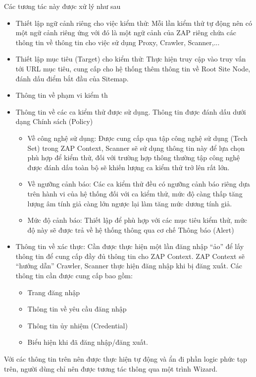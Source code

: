 \documentclass[./../main.tex]{subfiles}
\begin{document}
Các tương tác này được xử lý như sau
\begin{itemize}
	\item Thiết lập ngữ cảnh riêng cho việc kiểm thử: Mỗi lần kiểm thử tự động nên có một ngữ cảnh riêng ứng với đó là một ngữ cảnh của ZAP riêng chứa các thông tin về thông tin cho việc sử dụng Proxy, Crawler, Scanner,...
	\item Thiết lập mục tiêu (Target) cho kiểm thử: Thực hiện truy cập vào truy vấn tới URL mục tiêu, cung cấp cho hệ thống thêm thông tin về Root Site Node, đánh dấu điểm bắt đầu của Sitemap.
	\item Thông tin về phạm vi kiểm th
	\item Thông tin về các ca kiểm thử được sử dụng. Thông tin được đánh dấu dưới dạng Chính sách (Policy)
	      \begin{itemize}
		      \item Về công nghệ sử dụng: Được cung cấp qua tập công nghệ sử dụng (Tech Set) trong ZAP Context, Scanner sẽ sử dụng thông tin này để lựa chọn phù hợp để kiểm thử, đối với trường hợp thông thường tập công nghệ được đánh dấu toàn bộ sẽ khiến lượng ca kiểm thử trở lên rất lớn.
		      \item Về ngưỡng cảnh báo: Các ca kiểm thử đều có ngưỡng cảnh báo riêng dựa trên hành vi của hệ thống đối với ca kiểm thử, mức độ càng thấp tăng lượng âm tính giả càng lớn ngược lại làm tăng mức dương tính giả.
		      \item Mức độ cảnh báo: Thiết lập để phù hợp với các mục tiêu kiểm thử, mức độ này sẽ được trả về hệ thống thông qua cơ chế Thông báo (Alert)
	      \end{itemize}
	\item Thông tin về xác thực: Cần được thực hiện một lần đăng nhập “ảo” để lấy thông tin để cung cấp đầy đủ thông tin cho ZAP Context. ZAP Context sẽ “hướng dẫn” Crawler, Scanner thực hiện đăng nhập khi bị đăng xuất. Các thông tin cần được cung cấp bao gồm:
	      \begin{itemize}
		      \item Trang đăng nhập
		      \item Thông tin về yêu cầu đăng nhập
		      \item Thông tin ủy nhiệm (Credential)
		      \item Biểu hiện khi đã đăng nhập/đăng xuất.
	      \end{itemize}

\end{itemize}
Với các thông tin trên nên được thực hiện tự động và ẩn đi phần logic phức tạp trên, người dùng chỉ nên được tương tác thông qua một trình Wizard.
\end{document}

